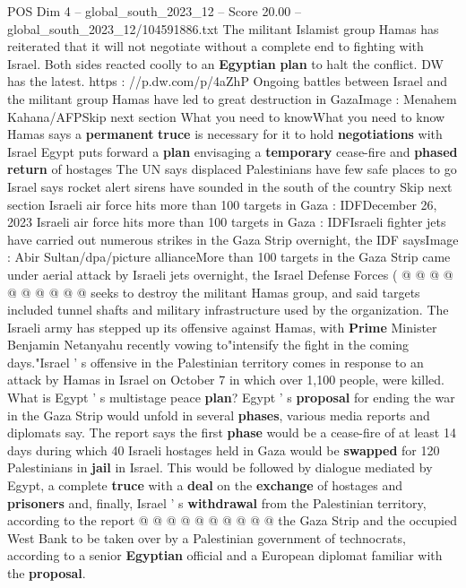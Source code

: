 \begin{textsample}{POS Dim 4 – global\_south\_2023\_12 – Score 20.00 – global\_south\_2023\_12/104591886.txt}  \label{ex:f4_pos_132}
The militant Islamist group Hamas has reiterated that it will not negotiate without a complete end to fighting with Israel.
Both sides reacted coolly to an \textbf{Egyptian} \textbf{plan} to halt the conflict.
DW has the latest. https : //p.dw.com/p/4aZhP Ongoing battles between Israel and the militant group Hamas have led to great destruction in GazaImage : Menahem Kahana/AFPSkip next section What you need to knowWhat you need to know Hamas says a \textbf{permanent} \textbf{truce} is necessary for it to hold \textbf{negotiations} with Israel Egypt puts forward a \textbf{plan} envisaging a \textbf{temporary} cease-fire and \textbf{phased} \textbf{return} of hostages The UN says displaced Palestinians have few safe places to go Israel says rocket alert sirens have sounded in the south of the country Skip next section Israeli air force hits more than 100 targets in Gaza : IDFDecember 26, 2023 Israeli air force hits more than 100 targets in Gaza : IDFIsraeli fighter jets have carried out numerous strikes in the Gaza Strip overnight, the IDF saysImage : Abir Sultan/dpa/picture allianceMore than 100 targets in the Gaza Strip came under aerial attack by Israeli jets overnight, the Israel Defense Forces ( @ @ @ @ @ @ @ @ @ @ seeks to destroy the militant Hamas group, and said targets included tunnel shafts and military infrastructure used by the organization.
The Israeli army has stepped up its offensive against Hamas, with \textbf{Prime} Minister Benjamin Netanyahu recently vowing to"intensify the fight in the coming days."Israel ' s offensive in the Palestinian territory comes in response to an attack by Hamas in Israel on October 7 in which over 1,100 people, were killed.
What is Egypt ' s multistage peace \textbf{plan}?
Egypt ' s \textbf{proposal} for ending the war in the Gaza Strip would unfold in several \textbf{phases}, various media reports and diplomats say.
The report says the first \textbf{phase} would be a cease-fire of at least 14 days during which 40 Israeli hostages held in Gaza would be \textbf{swapped} for 120 Palestinians in \textbf{jail} in Israel.
This would be followed by dialogue mediated by Egypt, a complete \textbf{truce} with a \textbf{deal} on the \textbf{exchange} of hostages and \textbf{prisoners} and, finally, Israel ' s \textbf{withdrawal} from the Palestinian territory, according to the report @ @ @ @ @ @ @ @ @ @ the Gaza Strip and the occupied West Bank to be taken over by a Palestinian government of technocrats, according to a senior \textbf{Egyptian} official and a European diplomat familiar with the \textbf{proposal}.

\end{textsample}

